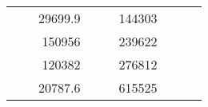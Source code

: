 \begin{table}[H]
\begin{tabular}{|ccrccrccc}
\multicolumn{1}{|c|}{\cellcolor[HTML]{FFFFC7}}                                & \multicolumn{1}{c|}{\cellcolor[HTML]{DDFDFF}}                      & \multicolumn{1}{r|}{\cellcolor[HTML]{DAE8FC}29699.9}   & \multicolumn{1}{c|}{\cellcolor[HTML]{FFFFC7}}                                & \multicolumn{1}{c|}{\cellcolor[HTML]{DDFDFF}}                       & \multicolumn{1}{r|}{\cellcolor[HTML]{DDFDFF}144303}    &                                                                              &                                                                    &                                                        \\ \cline{3-3} \cline{6-6}
\multicolumn{1}{|c|}{\cellcolor[HTML]{FFFFC7}}                                & \multicolumn{1}{c|}{\cellcolor[HTML]{DDFDFF}}                      & \multicolumn{1}{r|}{\cellcolor[HTML]{DDFDFF}150956}    & \multicolumn{1}{c|}{\cellcolor[HTML]{FFFFC7}}                                & \multicolumn{1}{c|}{\cellcolor[HTML]{DDFDFF}}                       & \multicolumn{1}{r|}{\cellcolor[HTML]{DAE8FC}239622}    &                                                                              &                                                                    &                                                        \\ \cline{3-3} \cline{6-6}
\multicolumn{1}{|c|}{\cellcolor[HTML]{FFFFC7}}                                & \multicolumn{1}{c|}{\cellcolor[HTML]{DDFDFF}}                      & \multicolumn{1}{r|}{\cellcolor[HTML]{DAE8FC}120382}    & \multicolumn{1}{c|}{\cellcolor[HTML]{FFFFC7}}                                & \multicolumn{1}{c|}{\cellcolor[HTML]{DDFDFF}}                       & \multicolumn{1}{r|}{\cellcolor[HTML]{DDFDFF}276812}    &                                                                              &                                                                    &                                                        \\ \cline{3-3} \cline{6-6}
\multicolumn{1}{|c|}{\cellcolor[HTML]{FFFFC7}}                                & \multicolumn{1}{c|}{\cellcolor[HTML]{DDFDFF}}                      & \multicolumn{1}{r|}{\cellcolor[HTML]{DDFDFF}20787.6}   & \multicolumn{1}{c|}{\cellcolor[HTML]{FFFFC7}}                                & \multicolumn{1}{c|}{\cellcolor[HTML]{DDFDFF}}                       & \multicolumn{1}{r|}{\cellcolor[HTML]{DAE8FC}615525}    &                                                                              &                                                                    &                                                        \\ \cline{3-3} \cline{6-6}

\end{tabular}
\end{table}
